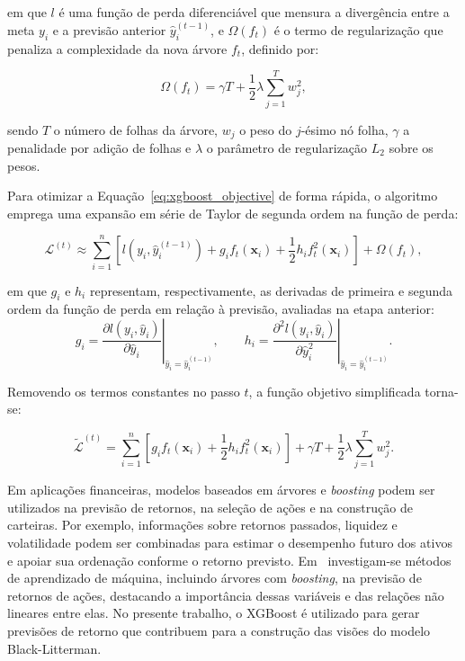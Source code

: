 \noindent em que $l$ é uma função de perda diferenciável que mensura a divergência entre a meta $y_i$ e a previsão anterior $\hat{y}_i^{(t-1)}$, e $\Omega(f_t)$ é o termo de regularização que penaliza a complexidade da nova árvore $f_t$, definido por:

\begin{equation}
    \Omega(f_t) = \gamma T + \frac{1}{2}\lambda \sum_{j=1}^{T} w_j^2,
    \label{eq:xgboost_reg}
\end{equation}

\noindent sendo $T$ o número de folhas da árvore, $w_j$ o peso do $j$-ésimo nó folha, $\gamma$ a penalidade por adição de folhas e $\lambda$ o parâmetro de regularização $L_2$ sobre os pesos.

Para otimizar a Equação~\eqref{eq:xgboost_objective} de forma rápida, o algoritmo emprega uma expansão em série de Taylor de segunda ordem na função de perda:

\begin{equation}
    \mathcal{L}^{(t)} \approx \sum_{i=1}^{n} \left[ l\left(y_i, \hat{y}_i^{(t-1)}\right) + g_i f_t(\mathbf{x}_i) + \frac{1}{2} h_i f_t^2(\mathbf{x}_i) \right] + \Omega(f_t),
    \label{eq:taylor_expansion}
\end{equation}

\noindent em que $g_i$ e $h_i$ representam, respectivamente,
as derivadas de primeira e segunda ordem da função de perda
em relação à previsão, avaliadas na etapa anterior:
\begin{equation}
    g_i =
    \left.
    \frac{\partial l(y_i,\hat{y}_i)}{\partial \hat{y}_i}
    \right|_{\hat{y}_i=\hat{y}_i^{(t-1)}},
    \qquad
    h_i =
    \left.
    \frac{\partial^2 l(y_i,\hat{y}_i)}{\partial \hat{y}_i^2}
    \right|_{\hat{y}_i=\hat{y}_i^{(t-1)}}.
\end{equation}

Removendo os termos constantes no passo $t$, a função objetivo simplificada torna-se:

\begin{equation}
    \tilde{\mathcal{L}}^{(t)} = \sum_{i=1}^{n} \left[ g_i f_t(\mathbf{x}_i) + \frac{1}{2} h_i f_t^2(\mathbf{x}_i) \right] + \gamma T + \frac{1}{2}\lambda \sum_{j=1}^{T} w_j^2.
\end{equation}

Em aplicações financeiras, modelos baseados em árvores e
\textit{boosting} podem ser utilizados na previsão de retornos,
na seleção de ações e na construção de carteiras. Por exemplo,
informações sobre retornos passados, liquidez e volatilidade
podem ser combinadas para estimar o desempenho futuro dos ativos
e apoiar sua ordenação conforme o retorno previsto.
Em~\cite{gu2020} investigam-se métodos de aprendizado
de máquina, incluindo árvores com \textit{boosting}, na previsão
de retornos de ações, destacando a importância dessas variáveis
e das relações não lineares entre elas. No presente trabalho,
o XGBoost é utilizado para gerar previsões de retorno que
contribuem para a construção das visões do modelo Black-Litterman.

